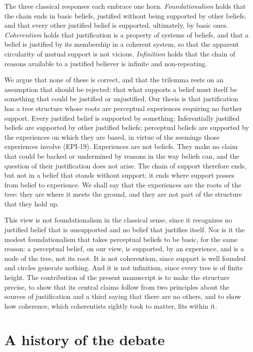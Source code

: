 \documentclass{situationist-preprint}
\begin{document}
The three classical responses each embrace one horn. \emph{Foundationalism} holds that the chain ends in basic beliefs, justified without being supported by other beliefs, and that every other justified belief is supported, ultimately, by basic ones. \emph{Coherentism} holds that justification is a property of systems of beliefs, and that a belief is justified by its membership in a coherent system, so that the apparent circularity of mutual support is not vicious. \emph{Infinitism} holds that the chain of reasons available to a justified believer is infinite and non-repeating.

We argue that none of these is correct, and that the trilemma rests on an assumption that should be rejected: that what supports a belief must itself be something that could be justified or unjustified. Our thesis is that justification has a tree structure whose roots are perceptual experiences requiring no further support. Every justified belief is supported by something. Inferentially justified beliefs are supported by other justified beliefs; perceptual beliefs are supported by the experiences on which they are based, in virtue of the seemings those experiences involve (EPI-19). Experiences are not beliefs. They make no claim that could be backed or undermined by reasons in the way beliefs can, and the question of their justification does not arise. The chain of support therefore ends, but not in a belief that stands without support; it ends where support passes from belief to experience. We shall say that the experiences are the roots of the tree: they are where it meets the ground, and they are not part of the structure that they hold up.

This view is not foundationalism in the classical sense, since it recognizes no justified belief that is unsupported and no belief that justifies itself. Nor is it the modest foundationalism that takes perceptual beliefs to be basic, for the same reason: a perceptual belief, on our view, is supported, by an experience, and is a node of the tree, not its root. It is not coherentism, since support is well founded and circles generate nothing. And it is not infinitism, since every tree is of finite height. The contribution of the present manuscript is to make the structure precise, to show that its central claims follow from two principles about the sources of justification and a third saying that there are no others, and to show how coherence, which coherentists rightly took to matter, fits within it.

\section{A history of the debate}\label{s:history}
\end{document}
